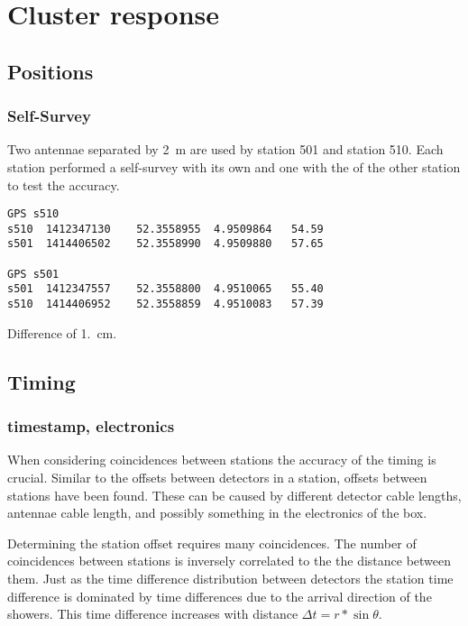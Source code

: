 \chapter{Cluster response}


\section{Positions}

\subsection{\gps Self-Survey}

Two \gps antennae separated by \SI{2}{\meter} are used by station 501
and station 510. Each station performed a self-survey with its own \gps
and one with the \gps of the other station to test the accuracy.
 
\begin{verbatim}
GPS s510
s510  1412347130	52.3558955	4.9509864	54.59
s501  1414406502	52.3558990	4.9509880	57.65

GPS s501
s501  1412347557	52.3558800	4.9510065	55.40
s510  1414406952	52.3558859	4.9510083	57.39
\end{verbatim}

Difference of \SI{1.}{\centi\meter}.


\section{Timing}

\subsection{\gps timestamp, electronics}

When considering coincidences between stations the accuracy of the
timing is crucial. Similar to the offsets between detectors in a
station, offsets between stations have been found. These can be caused
by different detector cable lengths, \gps antennae cable length, and
possibly something in the electronics of the \hisparc box.

Determining the station offset requires many coincidences. The number of
coincidences between stations is inversely correlated to the the
distance between them. Just as the time difference distribution between
detectors the station time difference is dominated by time differences
due to the arrival direction of the showers. This time difference
increases with distance $\Delta t = r * \sin{\theta}$.


